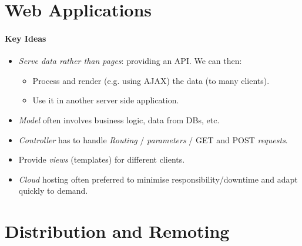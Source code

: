 \documentclass[twocolumn,english]{article}
\begin{document}
\section{Web Applications}

\paragraph{Key Ideas}
\begin{itemize}
\item \emph{Serve data rather than pages}: providing an API. We can then:
\begin{itemize}
\item Process and render (e.g. using AJAX) the data (to many clients).
\item Use it in another server side application.
\end{itemize}
\item \emph{Model} often involves business logic, data from DBs, etc.
\item \emph{Controller} has to handle \emph{Routing} / \emph{parameters}
/ GET and POST \emph{requests}.
\item Provide \emph{views} (templates) for different clients.
\item \emph{Cloud} hosting often preferred to minimise responsibility/downtime
and adapt quickly to demand.
\end{itemize}

\section{Distribution and Remoting}
\end{document}
